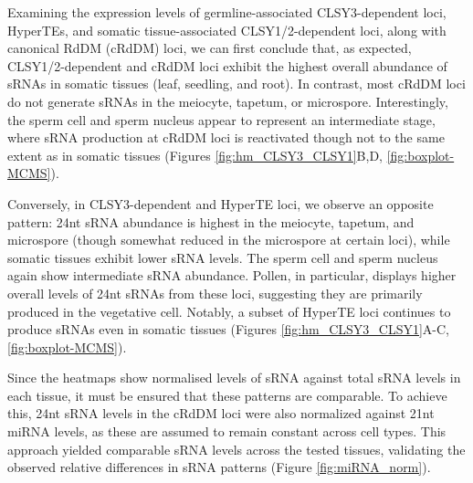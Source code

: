 Examining the expression levels of germline-associated CLSY3-dependent loci, HyperTEs, and somatic tissue-associated CLSY1/2-dependent loci, along with canonical RdDM (cRdDM) loci, we can first conclude that, as expected, CLSY1/2-dependent and cRdDM loci exhibit the highest overall abundance of sRNAs in somatic tissues (leaf, seedling, and root). In contrast, most cRdDM loci do not generate sRNAs in the meiocyte, tapetum, or microspore. Interestingly, the sperm cell and sperm nucleus appear to represent an intermediate stage, where sRNA production at cRdDM loci is reactivated though not to the same extent as in somatic tissues (Figures \ref{fig:hm_CLSY3_CLSY1}B,D, \ref{fig:boxplot-MCMS}).

Conversely, in CLSY3-dependent and HyperTE loci, we observe an opposite pattern: 24nt sRNA abundance is highest in the meiocyte, tapetum, and microspore (though somewhat reduced in the microspore at certain loci), while somatic tissues exhibit lower sRNA levels. The sperm cell and sperm nucleus again show intermediate sRNA abundance. Pollen, in particular, displays higher overall levels of 24nt sRNAs from these loci, suggesting they are primarily produced in the vegetative cell. Notably, a subset of HyperTE loci continues to produce sRNAs even in somatic tissues (Figures \ref{fig:hm_CLSY3_CLSY1}A-C, \ref{fig:boxplot-MCMS}).

Since the heatmaps show normalised levels of sRNA against total sRNA levels in each tissue, it must be ensured that these patterns are comparable. To achieve this, 24nt sRNA levels in the cRdDM loci were also normalized against 21nt miRNA levels, as these are assumed to remain constant across cell types. This approach yielded comparable sRNA levels across the tested tissues, validating the observed relative differences in sRNA patterns (Figure \ref{fig:miRNA_norm}).

